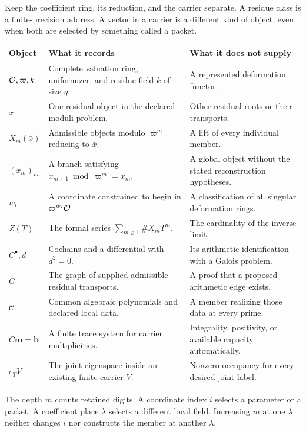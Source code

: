 Keep the coefficient ring, its reduction, and the carrier separate. A residue class is a finite-precision address. A vector in a carrier is a different kind of object, even when both are selected by something called a packet.
\par\noindent\begin{tabularx}{\linewidth}{@{}p{.19\linewidth}YY@{}}
\toprule
Object & What it records & What it does not supply\\\midrule
$\mathcal O,\varpi,k$ & Complete valuation ring, uniformizer, and residue field $k$ of size $q$. & A represented deformation functor.\\
$\bar x$ & One residual object in the declared moduli problem. & Other residual roots or their transports.\\
$X_m(\bar x)$ & Admissible objects modulo $\varpi^m$ reducing to $\bar x$. & A lift of every individual member.\\
$(x_m)_m$ & A branch satisfying $x_{m+1}\bmod\varpi^m=x_m$. & A global object without the stated reconstruction hypotheses.\\
$w_i$ & A coordinate constrained to begin in $\varpi^{w_i}\mathcal O$. & A classification of all singular deformation rings.\\
$Z(T)$ & The formal series $\sum_{m\ge1}\#X_mT^m$. & The cardinality of the inverse limit.\\
$C^\bullet,d$ & Cochains and a differential with $d^2=0$. & Its arithmetic identification with a Galois problem.\\
$G$ & The graph of supplied admissible residual transports. & A proof that a proposed arithmetic edge exists.\\
$\mathscr C$ & Common algebraic polynomials and declared local data. & A member realizing those data at every prime.\\
$C\bm m=\bm b$ & A finite trace system for carrier multiplicities. & Integrality, positivity, or available capacity automatically.\\
$e_TV$ & The joint eigenspace inside an existing finite carrier $V$. & Nonzero occupancy for every desired joint label.\\\bottomrule
\end{tabularx}
The depth $m$ counts retained digits. A coordinate index $i$ selects a parameter or a packet. A coefficient place $\lambda$ selects a different local field. Increasing $m$ at one $\lambda$ neither changes $i$ nor constructs the member at another $\lambda$.

